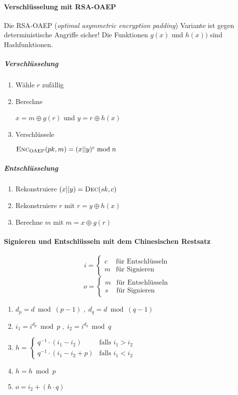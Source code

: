\documentclass[a4paper,landscape]{article}
\newcommand{\plaint}{\ensuremath{m}}
\newcommand{\ciphert}{\ensuremath{c}}
\newcommand{\skey}{\ensuremath{sk}}
\newcommand{\pkey}{\ensuremath{pk}}
\newcommand{\enc}{\textsc{Enc}}
\newcommand{\dec}{\textsc{Dec}}
\begin{document}
\begin{multicols*}{4}
	\paragraph{Verschlüsselung mit RSA-OAEP}
	Die RSA-OAEP (\emph{optimal asymmetric encryption padding}) Variante ist
	gegen deterministische Angriffe sicher! Die Funktionen \(g(x)\) und \(h(x))\)
	sind Hashfunktionen.

	\subparagraph{Verschlüsselung}
	\begin{enumerate}
		\item Wähle \(r\) zufällig
		\item Berechne \par
		      \(x = m \oplus g(r)\) und \(y = r \oplus h(x)\)
		\item Verschlüssele \par
		      \(\enc_{\text{OAEP}}(\pkey,\plaint) = (x||y)^{e} \bmod n\)
	\end{enumerate}

	\subparagraph{Entschlüsselung}
	\begin{enumerate}
		\item Rekonstruiere \((x||y) = \dec(\skey,\ciphert)\)
		\item Rekonstruiere \(r\) mit \(r = y \oplus h(x)\)
		\item Berechne \(\plaint\) mit \(\plaint = x \oplus g(r)\)
	\end{enumerate}

	\paragraph{Signieren und Entschlüsseln mit dem Chinesischen Restsatz}
	\[
		i =
		\begin{cases}
			c & \text{für Entschlüsseln} \\
			m & \text{für Signieren}
		\end{cases}
	\]
	\[
		o =
		\begin{cases}
			m & \text{für Entschlüsseln} \\
			s & \text{für Signieren}
		\end{cases}
	\]
	\begin{enumerate}
		\item $d_{p} = d \bmod (p-1) \;,\; d_{q} = d \bmod (q-1)$
		\item $i_{1} = i^{d_{p}} \bmod p \;,\; i_{2} = i^{d_{q}} \bmod q$
		\item \(
		      h =
		      \begin{cases}
			      q^{-1} \cdot (i_{1} - i_{2})     & \text{falls } i_{1} > i_{2} \\
			      q^{-1} \cdot (i_{1} - i_{2} + p) & \text{falls } i_{1} < i_{2}
		      \end{cases}
		      \)
		      \
		\item $h = h \bmod p$
		\item $o = i_{2} + (h \cdot q)$
	\end{enumerate}


\end{multicols*}
\end{document}

